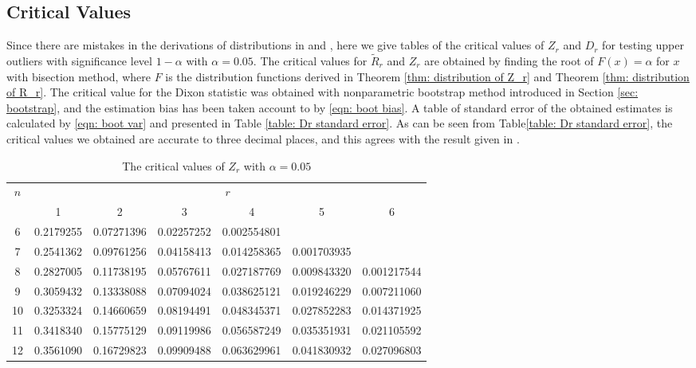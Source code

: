 \documentclass{report}
\begin{document}
    \subsection{Critical Values}
    
Since there are mistakes in the derivations of distributions in \cite{zerbet2003new} and \cite{jabbari2019detecting}, here we give tables of the critical values
of $Z_r$ and $D_r$ for testing upper outliers with significance level $1-\alpha$ with $\alpha =0.05$. The critical values for $\tilde R_r$ and $Z_r$ are obtained by finding the
root of $F(x) = \alpha$ for $x$ with bisection method, where $F$ is the distribution functions derived in Theorem \ref{thm: distribution of Z_r} and
Theorem \ref{thm: distribution of R_r}. The critical value for the Dixon statistic was obtained with nonparametric bootstrap method introduced in Section \ref{sec: bootstrap},
and the estimation bias has been taken account to by \eqref{eqn: boot bias}. A table of standard error of the obtained estimates is calculated by \eqref{eqn: boot var} and presented in Table \ref{table: Dr standard error}. As can
be seen from Table\ref{table: Dr standard error}, the critical values we obtained are accurate to three decimal places, and this agrees with the result given in \cite{zerbet2003new}.



\begin{table}[hbtp]
    \centering
    \caption{The critical values of $Z_r$ with $\alpha = 0.05$} \label{table: Zr critical values}
    \begin{tabular}{*{7}{c}}
        \toprule
        \multirow{2}{*}{$n$} & \multicolumn{6}{c}{$r$} \\
        \cline{2-7} 
        & 1 & 2 & 3 & 4 & 5 & 6 \\
        \midrule
        6 & 0.2179255 & 0.07271396 & 0.02257252 & 0.002554801 &           &           \\
        7 & 0.2541362 & 0.09761256 & 0.04158413 & 0.014258365 & 0.001703935 &           \\
        8 & 0.2827005 & 0.11738195 & 0.05767611 & 0.027187769 & 0.009843320 & 0.001217544 \\
        9 & 0.3059432 & 0.13338088 & 0.07094024 & 0.038625121 & 0.019246229 & 0.007211060 \\
        10 & 0.3253324 & 0.14660659 & 0.08194491 & 0.048345371 & 0.027852283 & 0.014371925 \\
        11 & 0.3418340 & 0.15775129 & 0.09119986 & 0.056587249 & 0.035351931 & 0.021105592 \\
        12 & 0.3561090 & 0.16729823 & 0.09909488 & 0.063629961 & 0.041830932 & 0.027096803 \\
        \bottomrule 
    \end{tabular}
\end{table}
\end{document}
